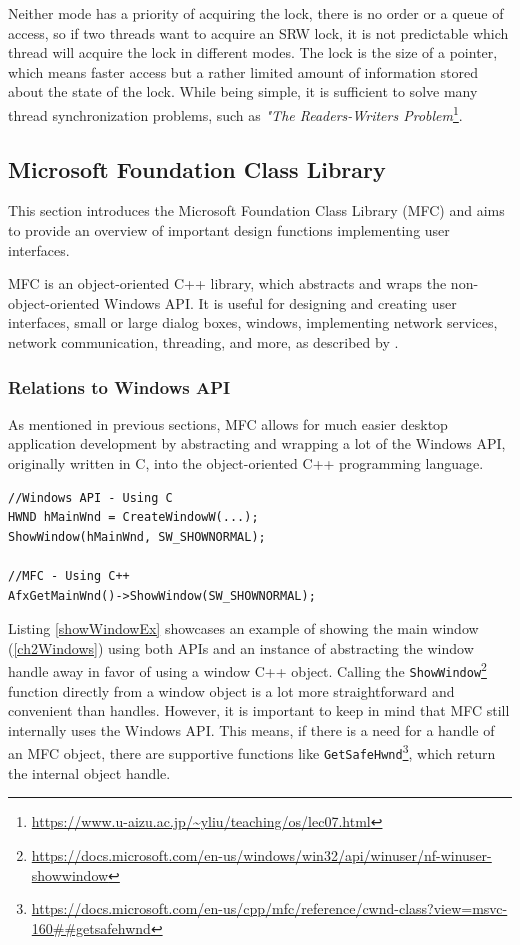 Neither mode has a priority of acquiring the lock, there is no order or a queue of access, so if two threads want to acquire an SRW lock, it is not predictable which thread will acquire the lock in different modes. The lock is the size of a pointer, which means faster access but a rather limited amount of information stored about the state of the lock. While being simple, it is sufficient to solve many thread synchronization problems, such as \textit{"The Readers-Writers Problem}\footnote{\url{https://www.u-aizu.ac.jp/~yliu/teaching/os/lec07.html}}.

\subsection{Microsoft Foundation Class Library}
This section introduces the Microsoft Foundation Class Library (MFC) and aims to provide an overview of important design functions implementing user interfaces.

MFC is an object-oriented C++ library, which abstracts and wraps the non-object-oriented Windows API. It is useful for designing and creating user interfaces, small or large dialog boxes, windows, implementing network services, network communication, threading, and more, as described by \cite{MFCDesktop}.

\subsubsection{Relations to Windows API}
As mentioned in previous sections, MFC allows for much easier desktop application development by abstracting and wrapping a lot of the Windows API, originally written in C, into the object-oriented C++ programming language.

\begin{lstlisting}[caption={Showing a window using Windows API and MFC}, label=showWindowEx]
//Windows API - Using C
HWND hMainWnd = CreateWindowW(...);
ShowWindow(hMainWnd, SW_SHOWNORMAL);

//MFC - Using C++
AfxGetMainWnd()->ShowWindow(SW_SHOWNORMAL);
\end{lstlisting}

Listing \ref{showWindowEx} showcases an example of showing the main window (\ref{ch2Windows}) using both APIs and an instance of abstracting the window handle away in favor of using a window C++ object. Calling the \lstinline{ShowWindow}\footnote{\url{https://docs.microsoft.com/en-us/windows/win32/api/winuser/nf-winuser-showwindow}} function directly from a window object is a lot more straightforward and convenient than handles. However, it is important to keep in mind that MFC still internally uses the Windows API.
This means, if there is a need for a handle of an MFC object, there are supportive functions like \lstinline{GetSafeHwnd}\footnote{\url{https://docs.microsoft.com/en-us/cpp/mfc/reference/cwnd-class?view=msvc-160##getsafehwnd}}, which return the internal object handle.

